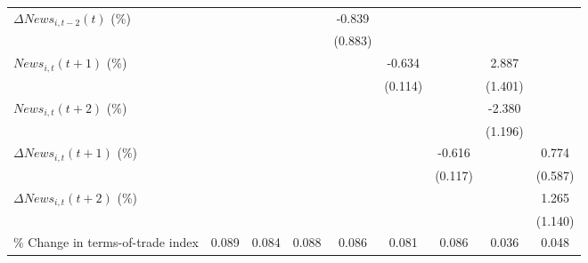 {\begin{tabular}{l*{8}{c}}
\addlinespace
$ \Delta News_{i,t-2}(t)$ (\%)&                     &                     &                     &      -0.839         &                     &                     &                     &                     \\
                    &                     &                     &                     &     (0.883)         &                     &                     &                     &                     \\
\addlinespace
$ News_{i,t}(t+1)$ (\%)&                     &                     &                     &                     &      -0.634\sym{***}&                     &       2.887\sym{**} &                     \\
                    &                     &                     &                     &                     &     (0.114)         &                     &     (1.401)         &                     \\
\addlinespace
$ News_{i,t}(t+2)$ (\%)&                     &                     &                     &                     &                     &                     &      -2.380\sym{**} &                     \\
                    &                     &                     &                     &                     &                     &                     &     (1.196)         &                     \\
\addlinespace
$ \Delta News_{i,t}(t+1)$ (\%)&                     &                     &                     &                     &                     &      -0.616\sym{***}&                     &       0.774         \\
                    &                     &                     &                     &                     &                     &     (0.117)         &                     &     (0.587)         \\
\addlinespace
$ \Delta News_{i,t}(t+2)$ (\%)&                     &                     &                     &                     &                     &                     &                     &       1.265         \\
                    &                     &                     &                     &                     &                     &                     &                     &     (1.140)         \\
\addlinespace
\% Change in terms-of-trade index&       0.089\sym{*}  &       0.084\sym{*}  &       0.088\sym{*}  &       0.086\sym{*}  &       0.081         &       0.086\sym{*}  &       0.036         &       0.048         \\

\end{tabular}}
